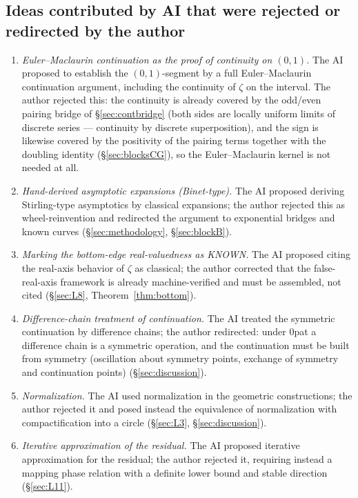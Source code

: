 \documentclass{article}
\newcommand{\zt}{\zeta}
\begin{document}
\subsection*{Ideas contributed by AI that were rejected or redirected by the author}
\begin{enumerate}
\item \emph{Euler--Maclaurin continuation as the proof of continuity on
$(0,1)$.} The AI proposed to establish the $(0,1)$-segment by a full
Euler--Maclaurin continuation argument, including the continuity of $\zt$ on
the interval. The author rejected this: the continuity is already covered by
the odd/even pairing bridge of \S\ref{sec:contbridge} (both sides are
locally uniform limits of discrete series --- continuity by discrete
superposition), and the sign is likewise covered by the positivity of the
pairing terms together with the doubling identity
(\S\ref{sec:blocksCG}), so the Euler--Maclaurin kernel is not needed at all.
\item \emph{Hand-derived asymptotic expansions (Binet-type).} The AI
proposed deriving Stirling-type asymptotics by classical expansions; the
author rejected this as wheel-reinvention and redirected the argument to
exponential bridges and known curves (\S\ref{sec:methodology},
\S\ref{sec:blockB}).
\item \emph{Marking the bottom-edge real-valuedness as KNOWN.} The AI
proposed citing the real-axis behavior of $\zt$ as classical; the author
corrected that the false-real-axis framework is already machine-verified and
must be assembled, not cited (\S\ref{sec:L8}, Theorem~\ref{thm:bottom}).
\item \emph{Difference-chain treatment of continuation.} The AI treated the
symmetric continuation by difference chains; the author redirected: under
0pat a difference chain is a symmetric operation, and the continuation must
be built from symmetry (oscillation about symmetry points, exchange of
symmetry and continuation points) (\S\ref{sec:discussion}).
\item \emph{Normalization.} The AI used normalization in the geometric
constructions; the author rejected it and posed instead the equivalence of
normalization with compactification into a circle (\S\ref{sec:L3},
\S\ref{sec:discussion}).
\item \emph{Iterative approximation of the residual.} The AI proposed
iterative approximation for the residual; the author rejected it, requiring
instead a mapping phase relation with a definite lower bound and stable
direction (\S\ref{sec:L11}).

\end{enumerate}
\end{document}

